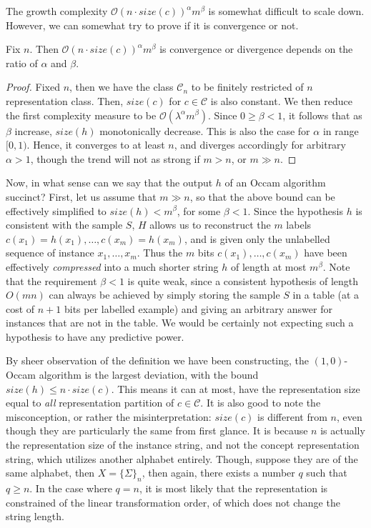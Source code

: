 The growth complexity $\mathcal{O}(n\cdot size(c))^{\alpha} m^{\beta}$ is somewhat difficult to scale down. However, we can somewhat try to prove if it is convergence or not. 

\begin{theorem}
    Fix $n$. Then $\mathcal{O}(n\cdot size(c))^{\alpha} m^{\beta}$ is convergence or divergence depends on the ratio of $\alpha$ and $\beta$. 
\end{theorem}
\begin{proof}
    Fixed $n$, then we have the class $\mathcal{C}_{n}$ to be finitely restricted of $n$ representation class. Then, $size(c)$ for $c\in \mathcal{C}$ is also constant. We then reduce the first complexity measure to be $\mathcal{O}(\lambda^{\alpha} m^{\beta})$. Since $0\geq\beta < 1$, it follows that as $\beta$ increase, $size(h)$ monotonically decrease. This is also the case for $\alpha$ in range $[0,1)$. Hence, it converges to at least $n$, and diverges accordingly for arbitrary $\alpha>1$, though the trend will not as strong if $m> n$, or $m\gg n$. 
\end{proof}

Now, in what sense can we say that the output $h$ of an Occam algorithm succinct? First, let us assume that $m\gg n$, so that the above bound can be effectively simplified to $size(h)< m^{\beta}$, for some $\beta < 1$. Since the hypothesis $h$ is consistent with the sample $S$, $H$ allows us to reconstruct the $m$ labels $c(x_1) = h(x_1),\dots,c(x_m)=h(x_m)$, and is given only the unlabelled sequence of instance $x_{1},\dots,x_{m}$. Thus the $m$ bits $c(x_1),\dots,c(x_m)$ have been effectively \textit{compressed} into a much shorter string $h$ of length at most $m^{\beta}$. Note that the requirement $\beta<1$ is quite weak, since a consistent hypothesis of length $O(mn)$ can always be achieved by simply storing the sample $S$ in a table (at a cost of $n+1$ bits per labelled example) and giving an arbitrary answer for instances that are not in the table. We would be certainly not expecting such a hypothesis to have any predictive power. 

By sheer observation of the definition we have been constructing, the $(1,0)$-Occam algorithm is the largest deviation, with the bound $size(h)\leq n \cdot size(c)$. This means it can at most, have the representation size equal to \textit{all} representation partition of $c\in \mathcal{C}$. It is also good to note the misconception, or rather the misinterpretation: $size(c)$ is different from $n$, even though they are particularly the same from first glance. It is because $n$ is actually the representation size of the instance string, and not the concept representation string, which utilizes another alphabet entirely. Though, suppose they are of the same alphabet, then $X= \{\Sigma\}_{n}$, then again, there exists a number $q$ such that $q \geq n$. In the case where $q=n$, it is most likely that the representation is constrained of the linear transformation order, of which does not change the string length. 

